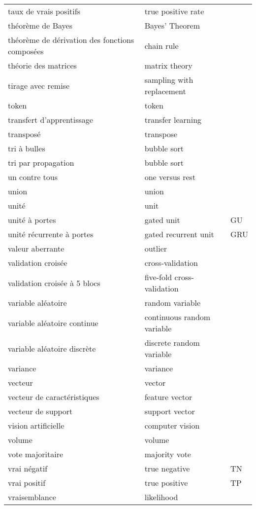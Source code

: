 \begin{longtable}{p{} p{} p{}}
taux de vrais positifs & true positive rate &  \\ 
théorème de Bayes & Bayes’ Theorem &  \\ 
théorème de dérivation des fonctions composées & chain rule &  \\ 
théorie des matrices & matrix theory &  \\ 
tirage avec remise & sampling with replacement &  \\ 
token & token &  \\ 
transfert d’apprentissage & transfer learning &  \\ 
transposé & transpose &  \\ 
tri à bulles & bubble sort &  \\ 
tri par propagation & bubble sort &  \\ 
un contre tous & one versus rest &  \\ 
union & union &  \\ 
unité & unit &  \\ 
unité à portes & gated unit & GU \\ 
unité récurrente à portes & gated recurrent unit & GRU \\ 
valeur aberrante & outlier &  \\ 
validation croisée & cross-validation &  \\ 
validation croisée à 5 blocs & five-fold cross-validation &  \\ 
variable aléatoire & random variable &  \\ 
variable aléatoire continue & continuous random variable &  \\ 
variable aléatoire discrète & discrete random variable &  \\ 
variance & variance &  \\ 
vecteur & vector &  \\ 
vecteur de caractéristiques & feature vector &  \\ 
vecteur de support & support vector &  \\ 
vision artificielle & computer vision &  \\ 
volume & volume &  \\ 
vote majoritaire & majority vote &  \\ 
vrai négatif & true negative & TN \\ 
vrai positif & true positive & TP \\ 
vraisemblance & likelihood &  \\
\end{longtable}
